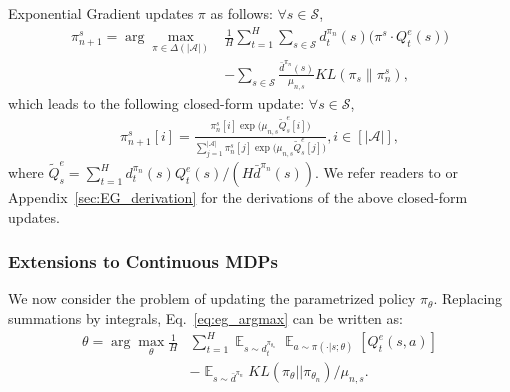 \documentclass{article}
\newcommand{\BB}[1]{\textcolor{red}{\bf Byron: {#1}}}
\begin{document}
Exponential Gradient updates $\pi$ as follows: $\forall s\in\mathcal{S}$,
\begin{align}
\label{eq:eg_argmax}
\pi^s_{n+1} = \arg\max_{\pi\in\Delta(|\mathcal{A}|)}&\frac{1}{H}\sum_{t=1}^H \sum_{s\in\mathcal{S}} d_t^{\pi_n}(s)\big( \pi^s\cdot Q^e_t(s)\big) \nonumber \\ &-\sum_{s\in\mathcal{S}}\frac{\bar{d}^{\pi_n}(s)}{\mu_{n,s}}KL(\pi_s \| \pi^s_n), 
\end{align} 
which leads to the following closed-form update: $\forall s\in\mathcal{S}$,
\begin{align}
\label{eq:eg_closed_form}
\pi_{n+1}^s[i] = \frac{\pi_n^s[i]\exp\big(\mu_{n,s} \tilde{Q}_s^e[i]\big)}{\sum_{j=1}^{|\mathcal{A}|}\pi_n^s[j]\exp\big(\mu_{n,s} \tilde{Q}_s^e[j]\big)}, i\in [|\mathcal{A}|],
\end{align} where $\tilde{Q}_s^e = \sum_{t=1}^H d_t^{\pi_n}(s)Q^e_t(s) / (H\bar{d}^{\pi_n}(s))$. We refer readers to \cite{shalev2012online} or Appendix~\ref{sec:EG_derivation} for the derivations of the above closed-form updates. 


\subsubsection{Extensions to Continuous MDPs}
We now consider the problem of updating the parametrized policy $\pi_{\theta}$. Replacing summations by integrals, Eq.~\ref{eq:eg_argmax} can be written as:
\begin{align}
\label{eq:continuous_eg}
\theta = \arg\max_{\theta}\frac{1}{H}& \sum_{t=1}^H  \mathop{\mathbb{E}}_{s\sim d_t^{\pi_{\theta_n}}}\mathop{\mathbb{E}}_{a\sim\pi(\cdot|s;\theta)}[Q_t^e(s,a)] \nonumber\\
& - \mathop{\mathbb{E}}_{s\sim\bar{d}^{\pi_n}}KL(\pi_{\theta} ||\pi_{\theta_n})/\mu_{n,s}.
\end{align} 
\end{document}
